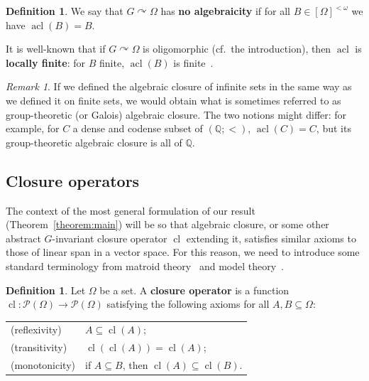 \documentclass{article}
\theoremstyle{remark}
\newtheorem{remark}[theorem]{Remark}
\theoremstyle{definition}
\newtheorem{definition}[theorem]{Definition}
\def\acts{\curvearrowright}
\newcommand{\remmic}[1]{\textcolor{orange}{MP: #1}}
\newcommand{\repau}[1]{\textcolor{ForestGreen}{PM: #1}}
\DeclareMathOperator{\cl}{cl}
\DeclareMathOperator{\acl}{acl}
\begin{document}
{{\begin{definition}
    We say that $G\acts\Omega$ has \textbf{no algebraicity} if for all $B\in[\Omega]^{<\omega}$ we have $\acl(B)=B$.
\end{definition}

It is well-known that if $G\acts\Omega$ is oligomorphic {(cf.~the introduction)}, then $\acl$ is \textbf{locally finite}: for $B$ finite, $\acl(B)$ is finite~\cite[Exercise 4.3.1]{tent2012course}. 

\begin{remark}
    If we defined the  algebraic closure of  infinite sets in the same way as we defined it on finite sets, we would obtain what is sometimes referred to as group-theoretic (or Galois) algebraic closure. The two notions might differ: 
    for example, for $C$ a dense and codense subset of $(\mathbb{Q}; <)$, $\acl(C)=C$, but its group-theoretic algebraic closure is all of $\mathbb{Q}$.%
\end{remark}


\subsection{{Closure operators}}


The context of the most general formulation of our result (Theorem~\ref{theorem:main}) will be so that algebraic closure, {or some other abstract $G$-invariant closure operator $\cl$ extending it,}  satisfies  similar axioms to those of linear span in a vector space. For this reason, we need to introduce some standard terminology from matroid theory~\cite{oxley2006matroid} and model theory~\cite{d2023axiomatic}.

\begin{definition} Let $\Omega$ be a set. A \textbf{closure operator} is a function $\cl\colon \mathcal{P}(\Omega)\to\mathcal{P}(\Omega)$ satisfying the following axioms {for all $A,B\subseteq \Omega$}: 

\begin{tabular}{ll}
    {\sc(reflexivity)} & $A\subseteq\cl(A)$;\\
{\sc (transitivity)} & $\cl(\cl(A))=\cl(A)$;\\
     {\sc (monotonicity)} & if $A\subseteq B$, then $\cl(A)\subseteq\cl(B)$.
\end{tabular}


\end{definition}}}
\end{document}
